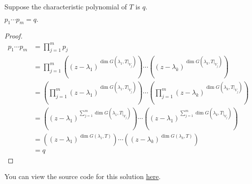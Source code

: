 \documentclass{amsart}
\newcommand{\restrict}[2]{\left.#1\right|_{#2}}
\newcommand{\pagenum}{269}
\newcommand{\probnum}{20}
\begin{document}
Suppose the characteristic polynomial of $T$ is $q.$
\begin{claim*}
    $p_1\cdots p_m=q.$
\end{claim*}
\begin{proof}
\begin{align*}
    p_1\cdots p_m &= \prod_{j=1}^m{p_j} \\
                  &= \prod_{j=1}^m{
                      \left((z-\lambda_1)^{\dim G(\lambda_1,\restrict{T}{V_j})}\right)
                  \cdots
              \left((z-\lambda_k)^{\dim G(\lambda_k,\restrict{T}{V_j})}\right)
          }\\
          &= \left(\prod_{j=1}^m
                      (z-\lambda_1)^{\dim G(\lambda_1,\restrict{T}{V_j})}
                      \right)
                      \cdots
                      \left(\prod_{j=1}^m
                      (z-\lambda_k)^{\dim G(\lambda_k,\restrict{T}{V_j})}
                      \right)\\
          &= \left((z-\lambda_1)
          ^{\sum_{j=1}^m\dim G(\lambda_1,\restrict{T}{V_j})}\right)
          \cdots
          \left((z-\lambda_1)
          ^{\sum_{j=1}^m\dim G(\lambda_k,\restrict{T}{V_j})}\right)\\
          &= \left((z-\lambda_1)^{\dim{G(\lambda_1,T)}}\right)
          \cdots
          \left((z-\lambda_k)^{\dim{G(\lambda_k,T)}}\right)\\
          &= q
\end{align*}
\end{proof}

\begin{note*}
You can view the source code for this solution
\href{https://github.com/thomasbreydo/linalg/blob/main/\pagenum_\probnum_Thomas_Breydo.tex}
{here}.
\end{note*}
\end{document}
